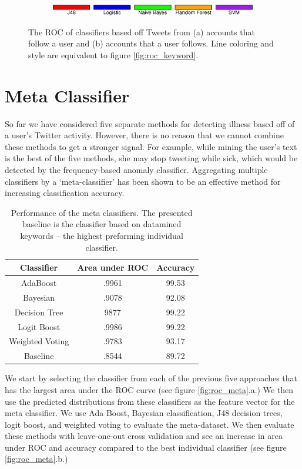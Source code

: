 \documentclass{acm_proc_article-sp}
\begin{document}
\begin{figure} [h]
\begin{subfigure}[b]{.2\textwidth}
\end{subfigure}
\begin{subfigure}[b]{.45\textwidth}
\includegraphics[width=\textwidth]{figs/keyword_legend.eps}
\end{subfigure}
\caption{The ROC of classifiers based off Tweets from (a) accounts that follow a user and (b) accounts that a user follows. Line coloring and style are equivalent to figure \ref{fig:roc_keyword}.}
\label{fig:roc_network}
\end{figure}

\section{Meta Classifier}

So far we have considered five separate methods for detecting illness based off of a user's Twitter activity. However, there is no reason that we cannot combine these methods to get a stronger signal. For example, while mining the user's text is the best of the five methods, she may stop tweeting while sick, which would be detected by the frequency-based anomaly classifier. Aggregating multiple classifiers by a `meta-classifier' has been shown to be an effective method for increasing classification accuracy. \cite{Frossyniotis:2004wx,Todorovski:2003hk}

\begin{table}
\centering
\begin{tabular}{|c|c|c|} \hline
Classifier&Area under ROC& Accuracy \\ \hline
AdaBoost & .9961 & 99.53\\ \hline
Bayesian & .9078 &  92.08\\ \hline
Decision Tree & 9877 & 99.22\\ \hline
Logit Boost & .9986 & 99.22\\ \hline
Weighted Voting & .9783 & 93.17\\ \hline
Baseline & .8544 & 89.72\\ 
\hline\end{tabular}
\caption{Performance of the meta classifiers. The presented baseline is the classifier based on datamined keywords -- the highest preforming individual classifier.}
\label{tab:meta_results}
\end{table}

We start by selecting the classifier from each of the previous five approaches that has the largest area under the ROC curve (see figure \ref{fig:roc_meta}.a.) We then use the predicted distributions from these classifiers as the feature vector for the meta classifier. We use Ada Boost, Bayesian classification, J48 decision trees, logit boost, and weighted voting to evaluate the meta-dataset. We then evaluate these methods with leave-one-out cross validation and see an increase in area under ROC and accuracy compared to the best individual classifier (see figure \ref{fig:roc_meta}.b.)
\end{document}
